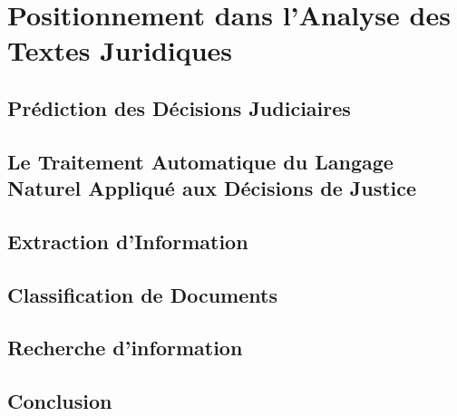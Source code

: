 %
\chapter{Positionnement dans l'Analyse des Textes Juridiques}
\label{sec:literature}


\section{Prédiction des Décisions Judiciaires}
\label{sec:literature:legalpredict}

\section{Le Traitement Automatique du Langage Naturel Appliqué aux Décisions de Justice}
\label{sec:literature:legaltal}


\section{Extraction d'Information}
\label{sec:literature:generalie}

\section{Classification de Documents}
\label{sec:literature:classification}

\section{Recherche d'information}
\label{sec:literature:ri}

\section{Conclusion}
\label{sec:literature:conclusion}
